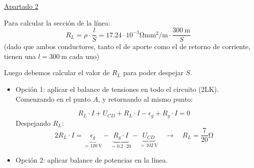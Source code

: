 \documentclass[10pt]{article}
\begin{document}
\vspace{3mm}

\underline{Apartado 2}

\vspace{5mm}

Para calcular la sección de la línea:
\[
  R_L = \rho \cdot \frac{l}{S} = {17.24 \cdot 10^{-3}}\si{\ohm\milli\meter\squared\per\meter} \cdot \frac{\qty{300}{\meter}}{S}
\]
(dado que ambos conductores, tanto el de aporte como el de retorno de corriente, tienen una $l=\qty{300}{\meter}$ cada uno)

\vspace{3mm}    
Luego debemos calcular el valor de $R_L$ para poder despejar $S$.
\begin{itemize}
    \item Opción 1: aplicar el balance de tensiones en todo el circuito (2LK). Comenzando en el punto $A$, y retornando al mismo punto:
    
    \[
      R_L \cdot I + U_{CD} + R_L \cdot I - \epsilon_g + R_g \cdot I = 0
    \]
    Despejando $R_L$:
    \[
      2 R_L \cdot I = \underbrace{\epsilon_g}_{=\qty{120}{\volt}} - \underbrace{R_g \cdot I}_{=0.2 \cdot 20} - \underbrace{U_{CD}}_{=\qty{102}{\volt}} \quad \rightarrow \quad \boxed{ R_L = {\frac{7}{20}}\si{\ohm} }
    \]

    \item Opción 2: aplicar balance de potencias en la línea.


\end{itemize}
\end{document}
